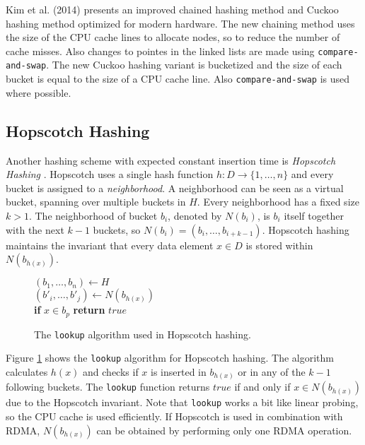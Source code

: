 Kim et al. \cite{enhanced_chained_cuckoo_hashing} (2014) presents an improved chained hashing method and Cuckoo hashing method optimized for modern hardware. The new chaining method uses the size of the CPU cache lines to allocate nodes, so to reduce the number of cache misses. Also changes to pointes in the linked lists are made using \texttt{compare-and-swap}. The new Cuckoo hashing variant is bucketized and the size of each bucket is equal to the size of a CPU cache line. Also \texttt{compare-and-swap} is used where possible. 

\subsection{Hopscotch Hashing}
Another hashing scheme with expected constant insertion time is \emph{Hopscotch Hashing} \cite{hopscotch}. Hopscotch uses a single hash function $h : D \rightarrow \{ 1, \dots, n \}$ and every bucket is assigned to a \emph{neighborhood}. A neighborhood can be seen as a virtual bucket, spanning over multiple buckets in $H$. Every neighborhood has a fixed size $k > 1$. The neighborhood of bucket $b_i$, denoted by $N(b_i)$, is $b_i$ itself together with the next $k - 1$ buckets, so $N(b_i) = (b_i, \dots, b_{i + k - 1})$. Hopscotch hashing maintains the invariant that every data element $x \in D$ is stored within $N(b_{h(x)})$.

\begin{figure}
	\centering
	\begin{algorithm}[H]
		\SetStartEndCondition{ }{}{}%
		\AlgoDontDisplayBlockMarkers\SetAlgoNoEnd\SetAlgoNoLine%

		 {
			$(b_1, \dots, b_n) \gets H$ \\
			$(b'_i, \dots, b'_j) \gets N(b_{h(x)})$ \\

			 {
				\textbf{if} $x \in b_p$ \textbf{return} $true$
			}

		}
	\end{algorithm}
	\label{fig:hopscotch_lookup}
	\caption{The \texttt{lookup} algorithm used in Hopscotch hashing.}
\end{figure}

Figure \ref{fig:hopscotch_lookup} shows the \texttt{lookup} algorithm for Hopscotch hashing. The algorithm calculates $h(x)$ and checks if $x$ is inserted in $b_{h(x)}$ or in any of the $k - 1$ following buckets. The \texttt{lookup} function returns $true$ if and only if $x \in N(b_{h(x)})$ due to the Hopscotch invariant. Note that \texttt{lookup} works a bit like linear probing, so the CPU cache is used efficiently. If Hopscotch is used in combination with RDMA, $N(b_{h(x)})$ can be obtained by performing only one RDMA operation. 

